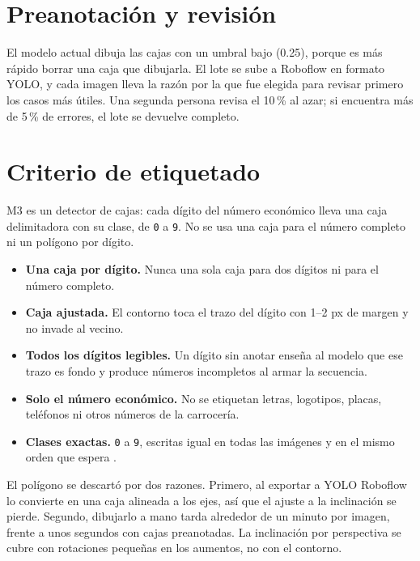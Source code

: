 \section{Preanotación y revisión}

El modelo actual dibuja las cajas con un umbral bajo (0.25), porque es
más rápido borrar una caja que dibujarla. El lote se sube a Roboflow en
formato YOLO, y cada imagen lleva la razón por la que fue elegida para
revisar primero los casos más útiles. Una segunda persona revisa el
10\,\% al azar; si encuentra más de 5\,\% de errores, el lote se devuelve
completo.

\section{Criterio de etiquetado}
\label{sec:criterio-etiquetado}

M3 es un detector de cajas: cada dígito del número económico lleva una
caja delimitadora con su clase, de \texttt{0} a \texttt{9}. No se usa una
caja para el número completo ni un polígono por dígito.

\begin{itemize}
  \item \textbf{Una caja por dígito.} Nunca una sola caja para dos dígitos
    ni para el número completo.
  \item \textbf{Caja ajustada.} El contorno toca el trazo del dígito con
    1--2 px de margen y no invade al vecino.
  \item \textbf{Todos los dígitos legibles.} Un dígito sin anotar enseña al
    modelo que ese trazo es fondo y produce números incompletos al armar la
    secuencia.
  \item \textbf{Solo el número económico.} No se etiquetan letras, logotipos,
    placas, teléfonos ni otros números de la carrocería.
  \item \textbf{Clases exactas.} \texttt{0} a \texttt{9}, escritas igual en
    todas las imágenes y en el mismo orden que espera
    .
\end{itemize}

El polígono se descartó por dos razones. Primero, al exportar a YOLO
Roboflow lo convierte en una caja alineada a los ejes, así que el ajuste a
la inclinación se pierde. Segundo, dibujarlo a mano tarda alrededor de un
minuto por imagen, frente a unos segundos con cajas preanotadas. La
inclinación por perspectiva se cubre con rotaciones pequeñas en los
aumentos, no con el contorno.

